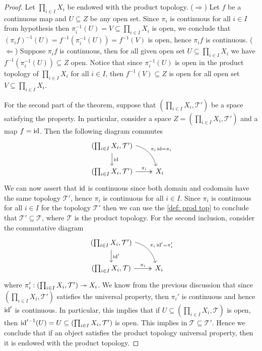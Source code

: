 \begin{proof}
  Let \(\prod_{i \in I} X_i\) be endowed with the product topology.
  (\(\Rightarrow\)) Let \(f\) be a continuous map and \(U \subseteq Z\) be any
  open set. Since \(\pi_i\) is continuous for all \(i \in I\) from hypothesis
  then \(\pi_i^{-1}(U) = V \subseteq \prod_{i \in I} X_i\) is open, we conclude
  that \((\pi_i  f)^{-1}(U) = f^{-1}(\pi_i^{-1}(U)) = f^{-1}(V)\) is open,
  hence \(\pi_i  f\) is continuous. (\(\Leftarrow\)) Suppose \(\pi_i
  f\) is continuous, then for all given open set \(U \subseteq \prod_{i \in I}
  X_i\) we have \(f^{-1}(\pi_i^{-1}(U)) \subseteq Z\) open. Notice that since
  \(\pi_i^{-1}(U)\) is open in the product topology of \(\prod_{i \in I} X_i\)
  for all \(i \in I\), then \(f^{-1}(V) \subseteq Z\) is open for all open set
  \(V \subseteq \prod_{i \in I} X_i\).

  For the second part of the theorem, suppose that \((\prod_{i \in I} X_i,
  \mathcal T')\) be a space satisfying the property. In particular, consider a
  space \(Z = (\prod_{i \in I} X_i, \mathcal T')\) and a map \(f = \operatorname{id}\). Then
  the following diagram commutes
  \[
    \begin{tikzcd}
      (\prod_{i \in I} X_i, \mathcal T')
      \ar[d, "\Id"]
      \ar[dr, bend left, "\pi_i  \Id = \pi_i"] \\
      (\prod_{i \in I} X_i, \mathcal T')
      \ar[r, two heads, "\pi_i"]
        &X_i
    \end{tikzcd}
  \]
  We can now assert that \(\operatorname{id}\) is continuous since both domain and codomain
  have the same topology \(\mathcal T'\), hence \(\pi_i\) is continuous for all
  \(i \in I\). Since \(\pi_i\) is continuous for all \(i \in I\) for the
  topology \(\mathcal T'\) then we can use the \cref{def: prod top} to conclude
  that \(\mathcal T' \subseteq \mathcal T\), where \(\mathcal T\) is the product
  topology. For the second inclusion, consider the commutative diagram
  \[
    \begin{tikzcd}
      (\prod_{i \in I} X_i, \mathcal T')
      \ar[d, "\Id'"]
      \ar[dr, bend left, "\pi_i  \Id' = \pi_i'"] \\
      (\prod_{i \in I} X_i, \mathcal T)
      \ar[r, two heads, "\pi_i"]
        &X_i
    \end{tikzcd}
  \]
  where \(\pi_i': (\prod_{i \in I} X_i, \mathcal T') \twoheadrightarrow X_i\). We know from
  the previous discussion that since \((\prod_{i \in I} X_i, \mathcal T')\)
  satisfies the universal property, then \(\pi_i'\) is continuous and hence
  \(\operatorname{id}'\) is continuous. In particular, this implies that if  \(U \subseteq
  (\prod_{i \in I} X_i, \mathcal T)\) is open, then \(\operatorname{id}'^{-1}(U) = U
  \subseteq (\prod_{i \in I} X_i, \mathcal T')\) is open. This implies in
  \(\mathcal T \subseteq \mathcal T'\). Hence we conclude that if an object
  satisfies the product topology universal property, then it is endowed with the
  product topology.
\end{proof}

